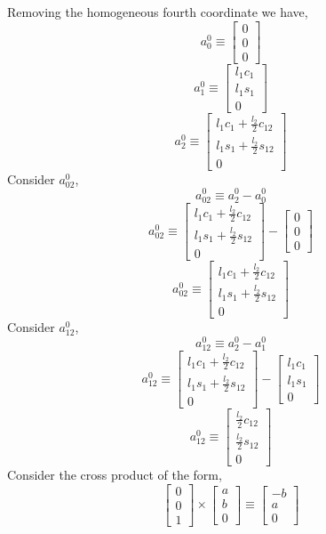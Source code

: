 \documentclass[12pt]{article}
\begin{document}
Removing the homogeneous fourth coordinate we have,
\[
  a_0^0 \equiv
  \begin{bmatrix} 0 \\ 0 \\ 0  \end{bmatrix}
\]
\[
  a_1^0 \equiv
  \begin{bmatrix}
    l_1c_1\\
    l_1s_1\\
    0
  \end{bmatrix}
\]
\[
  a_2^0 \equiv
  \begin{bmatrix}
    l_1c_1 + \frac{l_2}{2}c_{12}\\
    l_1s_1 + \frac{l_2}{2}s_{12}\\
    0
  \end{bmatrix}
\]
Consider $a_{02}^0$,
\[
  a_{02}^0 \equiv a_2^0 - a_0^0
\]
\[
  a_{02}^0 \equiv
  \begin{bmatrix}
    l_1c_1 + \frac{l_2}{2}c_{12}\\
    l_1s_1 + \frac{l_2}{2}s_{12}\\
    0
  \end{bmatrix}
  -
  \begin{bmatrix} 0 \\ 0 \\ 0  \end{bmatrix}
\]
\[
  a_{02}^0 \equiv
  \begin{bmatrix}
    l_1c_1 + \frac{l_2}{2}c_{12}\\
    l_1s_1 + \frac{l_2}{2}s_{12}\\
    0
  \end{bmatrix}
\]
Consider $a_{12}^0$,
\[
  a_{12}^0 \equiv a_2^0 - a_1^0
\]
\[
  a_{12}^0 \equiv
  \begin{bmatrix}
    l_1c_1 + \frac{l_2}{2}c_{12}\\
    l_1s_1 + \frac{l_2}{2}s_{12}\\
    0
  \end{bmatrix}
  -
  \begin{bmatrix}
    l_1c_1\\
    l_1s_1\\
    0
  \end{bmatrix}
\]
\[
  a_{12}^0 \equiv
  \begin{bmatrix}
    \frac{l_2}{2}c_{12}\\
    \frac{l_2}{2}s_{12}\\
    0
  \end{bmatrix}
\]
Consider the cross product of the form,
\[
  \begin{bmatrix} 0 \\ 0 \\ 1 \end{bmatrix} \times \begin{bmatrix} a \\ b \\ 0 \end{bmatrix}
  \equiv
  \begin{bmatrix} -b \\ a \\ 0 \end{bmatrix}
\]
\end{document}
